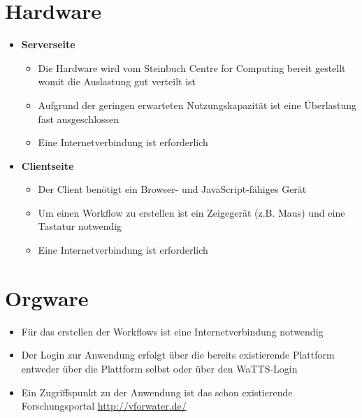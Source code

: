 \newpage

\section{Hardware}

\begin{itemize}
    \item \textbf{Serverseite}
        \begin{itemize}
            \item Die Hardware wird vom \Gls{Steinbuch Centre for Computing} bereit gestellt womit die Auslastung gut verteilt ist
            \item Aufgrund der geringen erwarteten Nutzungskapazität ist eine Überlastung fast ausgeschlossen
            \item Eine Internetverbindung ist erforderlich
        \end{itemize}
    \item \textbf{Clientseite}
        \begin{itemize}
            \item Der Client benötigt ein Browser- und JavaScript-fähiges Gerät
            \item Um einen Workflow zu erstellen ist ein Zeigegerät (z.B. Maus) und eine Tastatur notwendig
            \item Eine Internetverbindung ist erforderlich
        \end{itemize}
\end{itemize}

\section{Orgware}

\begin{itemize}
    \item Für das erstellen der Workflows ist eine Internetverbindung notwendig
    \item Der Login zur Anwendung erfolgt über die bereits existierende Plattform entweder über die Plattform selbst oder über den WaTTS-Login
    \item Ein Zugriffspunkt zu der Anwendung ist das schon existierende Forschungsportal \url{http://vforwater.de/}
\end{itemize}

